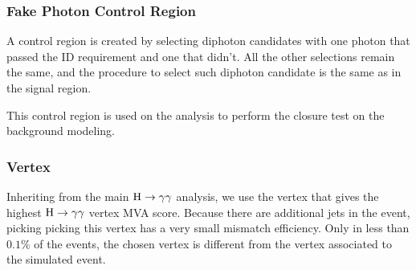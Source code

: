 




\subsubsection{Fake Photon Control Region}\label{sec:PCR}
A control region is created by selecting diphoton candidates with one photon that passed the ID requirement and one that didn't. All the other selections remain the same, and the procedure to select such diphoton candidate is the same as in the signal region.

This control region is used on the analysis to perform the closure test on the background modeling.

\subsubsection{Vertex}
Inheriting from the main $\mathrm{H}\to\gamma\gamma$ analysis, we use the vertex that gives the highest $\mathrm{H}\to\gamma\gamma$ vertex MVA score. 
Because there are additional jets in the event, picking picking this vertex has a very small mismatch efficiency. 
Only in less than $0.1\%$ of the events, the chosen vertex is different from the vertex associated to the simulated event. 

